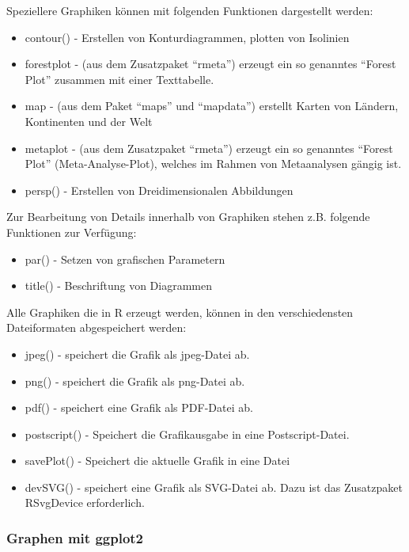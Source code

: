 \documentclass[]{article}
\providecommand{\tightlist}{%
  \setlength{\itemsep}{0pt}\setlength{\parskip}{0pt}}
\begin{document}
Speziellere Graphiken können mit folgenden Funktionen dargestellt
werden:

\begin{itemize}
\tightlist
\item
  contour() - Erstellen von Konturdiagrammen, plotten von Isolinien
\item
  forestplot - (aus dem Zusatzpaket ``rmeta'') erzeugt ein so genanntes
  ``Forest Plot'' zusammen mit einer Texttabelle.
\item
  map - (aus dem Paket ``maps'' und ``mapdata'') erstellt Karten von
  Ländern, Kontinenten und der Welt
\item
  metaplot - (aus dem Zusatzpaket ``rmeta'') erzeugt ein so genanntes
  ``Forest Plot'' (Meta-Analyse-Plot), welches im Rahmen von
  Metaanalysen gängig ist.
\item
  persp() - Erstellen von Dreidimensionalen Abbildungen
\end{itemize}

Zur Bearbeitung von Details innerhalb von Graphiken stehen z.B. folgende
Funktionen zur Verfügung:

\begin{itemize}
\tightlist
\item
  par() - Setzen von grafischen Parametern
\item
  title() - Beschriftung von Diagrammen
\end{itemize}

Alle Graphiken die in R erzeugt werden, können in den verschiedensten
Dateiformaten abgespeichert werden:

\begin{itemize}
\tightlist
\item
  jpeg() - speichert die Grafik als jpeg-Datei ab.
\item
  png() - speichert die Grafik als png-Datei ab.
\item
  pdf() - speichert eine Grafik als PDF-Datei ab.
\item
  postscript() - Speichert die Grafikausgabe in eine Postscript-Datei.
\item
  savePlot() - Speichert die aktuelle Grafik in eine Datei
\item
  devSVG() - speichert eine Grafik als SVG-Datei ab. Dazu ist das
  Zusatzpaket RSvgDevice erforderlich.
\end{itemize}

\subsubsection*{Graphen mit ggplot2}\label{graphen-mit-ggplot2}
\end{document}
